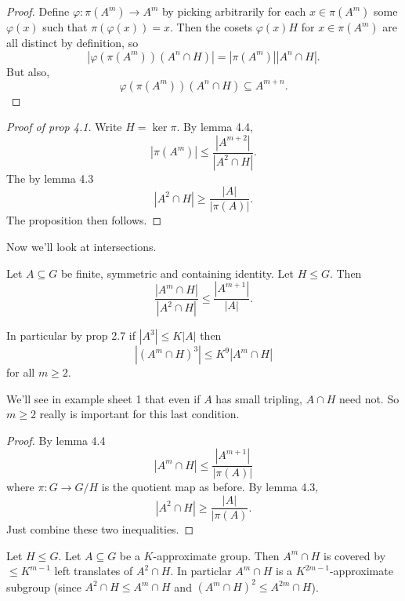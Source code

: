 \documentclass[a4paper]{article}
\begin{document}
\begin{proof}
  Define \(\varphi: \pi(A^m) \to A^m\) by picking arbitrarily for each \(x \in \pi(A^m)\) some \(\varphi(x)\) such that \(\pi(\varphi(x)) = x\). Then the cosets \(\varphi(x)H\) for \(x \in \pi(A^m)\) are all distinct by definition, so
  \[
    |\varphi(\pi(A^m)) (A^n \cap H)| = |\pi(A^m)| |A^n \cap H|.
  \]
  But also,
  \[
    \varphi(\pi(A^m)) (A^n \cap H) \subseteq A^{m + n}.
  \]
\end{proof}

\begin{proof}[Proof of prop 4.1]
  Write \(H = \ker \pi\). By lemma 4.4,
  \[
    |\pi(A^m)| \leq \frac{|A^{m + 2}|}{|A^2 \cap H|}.
  \]
  The by lemma 4.3
  \[
    |A^2 \cap H| \geq \frac{|A|}{|\pi(A)|}.
  \]
  The proposition then follows.
\end{proof}

Now we'll look at intersections.

\begin{proposition}
  Let \(A \subseteq G\) be finite, symmetric and containing identity. Let \(H \leq G\). Then
  \[
    \frac{|A^m \cap H|}{|A^2 \cap H|} \leq \frac{|A^{m + 1}|}{|A|}.
  \]

  In particular by prop 2.7 if \(|A^3| \leq K|A|\) then
  \[
    |(A^m \cap H)^3| \leq K^9 |A^m \cap H|
  \]
  for all \(m \geq 2\).
\end{proposition}

\begin{remark}
  We'll see in example sheet 1 that even if \(A\) has small tripling, \(A \cap H\) need not. So \(m \geq 2\) really is important for this last condition.
\end{remark}

\begin{proof}
  By lemma 4.4
  \[
    |A^m \cap H| \leq \frac{|A^{m + 1}|}{|\pi(A)|}
  \]
  where \(\pi: G \to G/H\) is the quotient map as before. By lemma 4.3,
  \[
    |A^2 \cap H| \geq \frac{|A|}{|\pi(A)}.
  \]
  Just combine these two inequalities.
\end{proof}

\begin{proposition}
  Let \(H \leq G\). Let \(A \subseteq G\) be a \(K\)-approximate group. Then \(A^m \cap H\) is covered by \(\leq K^{m - 1}\) left translates of \(A^2 \cap H\). In particlar \(A^m \cap H\) is a \(K^{2m - 1}\)-approximate subgroup (since \(A^2 \cap H \leq A^m \cap H\) and \((A^m \cap H)^2 \leq A^{2m} \cap H\)).
\end{proposition}
\end{document}

